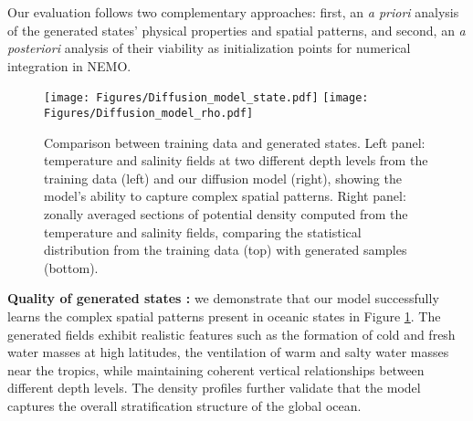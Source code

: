 \documentclass{article}
\begin{document}
Our evaluation follows two complementary approaches: first, an \textit{a priori} analysis of the generated states' physical properties and spatial patterns, and second, an \textit{a posteriori} analysis of their viability as initialization points for numerical integration in NEMO.




\begin{figure}[htb]
    \centering
    \texttt{[image: Figures/Diffusion\_model\_state.pdf]}%
    \hfill
    \texttt{[image: Figures/Diffusion\_model\_rho.pdf]}%
     \caption{Comparison between training data and generated states. Left panel: temperature and salinity fields at two different depth levels from the training data (left) and our diffusion model (right), showing the model's ability to capture complex spatial patterns. Right panel: zonally averaged sections of potential density computed from the temperature and salinity fields, comparing the statistical distribution from the training data (top) with generated samples (bottom).}
    \label{fig:res-1}
\end{figure}

 \textbf{Quality of generated states :} we demonstrate that our model successfully learns the complex spatial patterns present in oceanic states in Figure \ref{fig:res-1}. The generated fields exhibit realistic features such as the formation of cold and fresh water masses at high latitudes, the ventilation of warm and salty water masses near the tropics, while maintaining coherent vertical relationships between different depth levels. The density profiles further validate that the model captures the overall stratification structure of the global ocean.
\end{document}
